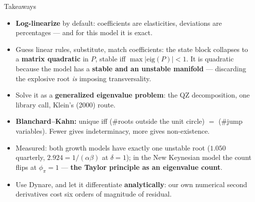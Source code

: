 \begin{frame}{Takeaways}
\begin{takeawaybox}
\begin{itemize}\small
  \item \textbf{Log-linearize} by default: coefficients are elasticities, deviations are percentages --- and for this model it is exact.
  \item Guess linear rules, substitute, match coefficients: the state block collapses to a \textbf{matrix quadratic} in $P$, stable iff $\max|\mathrm{eig}(P)|<1$. It is quadratic because the model has a \textbf{stable and an unstable manifold} --- discarding the explosive root \emph{is} imposing transversality.
  \item Solve it as a \textbf{generalized eigenvalue problem}: the QZ decomposition, one library call, Klein's (2000) route.
  \item \textbf{Blanchard--Kahn:} unique iff (\#roots outside the unit circle) $=$ (\#jump variables). Fewer gives indeterminacy, more gives non-existence.
  \item Measured: both growth models have exactly one unstable root ($1.050$ quarterly, $2.924=1/(\alpha\beta)$ at $\delta=1$); in the New Keynesian model the count flips at $\phi_\pi=1$ --- \textbf{the Taylor principle as an eigenvalue count}.
  \item Use Dynare, and let it differentiate \textbf{analytically}: our own numerical second derivatives cost six orders of magnitude of residual.
\end{itemize}
\end{takeawaybox}
\end{frame}

